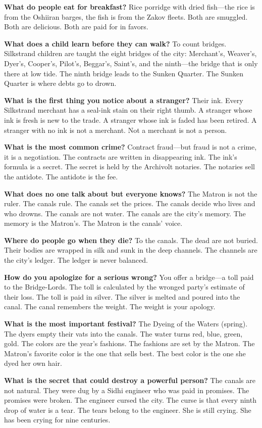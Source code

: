 \vspace{1em}

\begin{almanac}
\textbf{What do people eat for breakfast?} Rice porridge with dried fish---the rice is from the Oshiiran barges, the fish is from the Zakov fleets. Both are smuggled. Both are delicious. Both are paid for in favors.

\textbf{What does a child learn before they can walk?} To count bridges. Silkstrand children are taught the eight bridges of the city: Merchant's, Weaver's, Dyer's, Cooper's, Pilot's, Beggar's, Saint's, and the ninth---the bridge that is only there at low tide. The ninth bridge leads to the Sunken Quarter. The Sunken Quarter is where debts go to drown.

\textbf{What is the first thing you notice about a stranger?} Their ink. Every Silkstrand merchant has a seal-ink stain on their right thumb. A stranger whose ink is fresh is new to the trade. A stranger whose ink is faded has been retired. A stranger with no ink is not a merchant. Not a merchant is not a person.

\textbf{What is the most common crime?} Contract fraud---but fraud is not a crime, it is a negotiation. The contracts are written in disappearing ink. The ink's formula is a secret. The secret is held by the Archivolt notaries. The notaries sell the antidote. The antidote is the fee.

\textbf{What does no one talk about but everyone knows?} The Matron is not the ruler. The canals rule. The canals set the prices. The canals decide who lives and who drowns. The canals are not water. The canals are the city's memory. The memory is the Matron's. The Matron is the canals' voice.

\textbf{Where do people go when they die?} To the canals. The dead are not buried. Their bodies are wrapped in silk and sunk in the deep channels. The channels are the city's ledger. The ledger is never balanced.

\textbf{How do you apologize for a serious wrong?} You offer a bridge---a toll paid to the Bridge-Lords. The toll is calculated by the wronged party's estimate of their loss. The toll is paid in silver. The silver is melted and poured into the canal. The canal remembers the weight. The weight is your apology.

\textbf{What is the most important festival?} The Dyeing of the Waters (spring). The dyers empty their vats into the canals. The water turns red, blue, green, gold. The colors are the year's fashions. The fashions are set by the Matron. The Matron's favorite color is the one that sells best. The best color is the one she dyed her own hair.

\textbf{What is the secret that could destroy a powerful person?} The canals are not natural. They were dug by a Sidhi engineer who was paid in promises. The promises were broken. The engineer cursed the city. The curse is that every ninth drop of water is a tear. The tears belong to the engineer. She is still crying. She has been crying for nine centuries.
\end{almanac}

